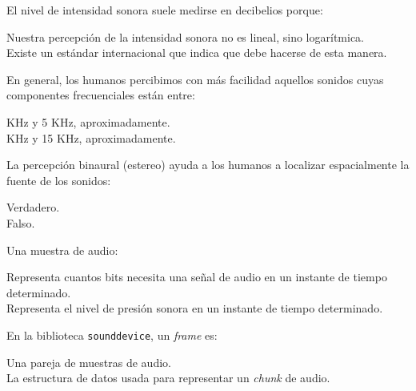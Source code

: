 \documentclass[legalpaper, 12pt, addpoints]{exam}
\begin{document}
\begin{questions}
\vspace{0.10in}

\question El nivel de intensidad sonora suele medirse en decibelios porque:

\begin{oneparchoices}
  \choice Nuestra percepción de la intensidad sonora no es lineal, sino logarítmica.\\
  \choice Existe un estándar internacional que indica que debe hacerse de esta manera.
\end{oneparchoices}

\vspace{0.10in}

\question En general, los humanos percibimos con más facilidad aquellos sonidos cuyas componentes frecuenciales están entre:

\begin{oneparchoices}
   KHz y 5 KHz, aproximadamente.\\
   KHz y 15 KHz, aproximadamente.
\end{oneparchoices}
  
\vspace{0.10in}

\question La percepción binaural (estereo) ayuda a los humanos a localizar espacialmente la fuente de los sonidos:

\begin{oneparchoices}
  \choice Verdadero.\\
  \choice Falso.
\end{oneparchoices}
  
\vspace{0.10in}

\question Una muestra de audio:

\begin{oneparchoices}
  \choice Representa cuantos bits necesita una señal de audio en un instante de tiempo determinado.\\
  \choice Representa el nivel de presión sonora en un instante de tiempo determinado.
\end{oneparchoices}
  
\vspace{0.10in}

\question En la biblioteca \texttt{sounddevice}, un \emph{frame} es:

\begin{oneparchoices}
  \choice Una pareja de muestras de audio.\\
  \choice La estructura de datos usada para representar un \emph{chunk} de audio.
\end{oneparchoices}
  

\end{questions}
\end{document}
